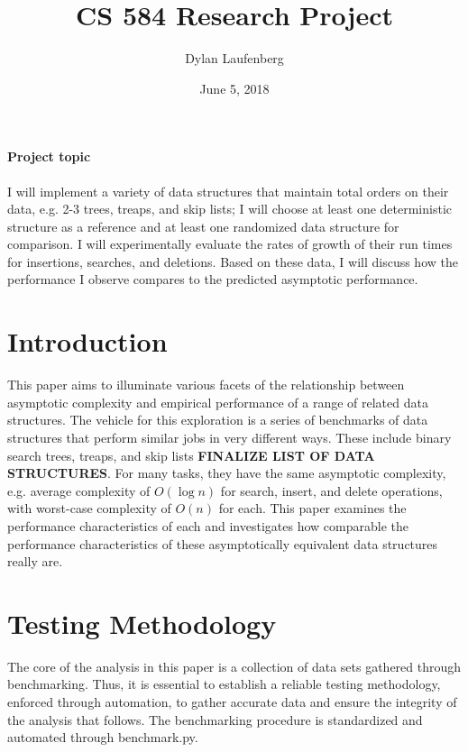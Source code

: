 \documentclass{article}
\title{CS 584 Research Project}
\author{ Dylan Laufenberg }
\date{June 5, 2018}
\newcommand {\todo}[1] {{\textbf{\color{red}#1}}}
\begin{document}
\maketitle

\paragraph{Project topic} I will implement a variety of data structures that maintain total orders on their data, e.g. 2-3 trees, treaps, and skip lists; I will choose at least one deterministic structure as a reference and at least one randomized data structure for comparison. I will experimentally evaluate the rates of growth of their run times for insertions, searches, and deletions. Based on these data, I will discuss how the performance I observe compares to the predicted asymptotic performance.

\section{Introduction}
This paper aims to illuminate various facets of the relationship between asymptotic complexity and empirical performance of a range of related data structures. The vehicle for this exploration is a series of benchmarks of data structures that perform similar jobs in very different ways. These include binary search trees, treaps, and skip lists \todo{FINALIZE LIST OF DATA STRUCTURES}. For many tasks, they have the same asymptotic complexity, e.g. average complexity of $O(\log n)$ for search, insert, and delete operations, with worst-case complexity of $O(n)$ for each. This paper examines the performance characteristics of each and investigates how comparable the performance characteristics of these asymptotically equivalent data structures really are.

\section{Testing Methodology}

The core of the analysis in this paper is a collection of data sets gathered through benchmarking. Thus, it is essential to establish a reliable testing methodology, enforced through automation, to gather accurate data and ensure the integrity of the analysis that follows. The benchmarking procedure is standardized and automated through benchmark.py.
\end{document}
